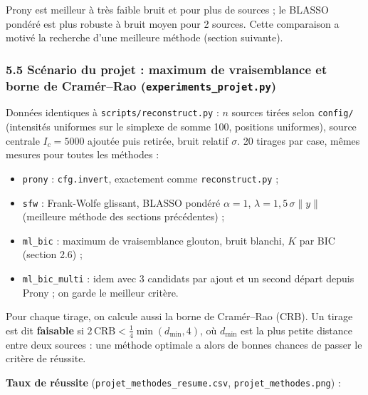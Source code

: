 \documentclass[
  french,
]{article}
\providecommand{\tightlist}{%
  \setlength{\itemsep}{0pt}\setlength{\parskip}{0pt}}
\begin{document}
Prony est meilleur à très faible bruit et pour plus de sources ; le
BLASSO pondéré est plus robuste à bruit moyen pour 2 sources. Cette
comparaison a motivé la recherche d'une meilleure méthode (section
suivante).

\subsubsection{\texorpdfstring{5.5 Scénario du projet : maximum de
vraisemblance et borne de Cramér--Rao
(\texttt{experiments\_projet.py})}{5.5 Scénario du projet : maximum de vraisemblance et borne de Cramér--Rao (experiments\_projet.py)}}\label{scuxe9nario-du-projet-maximum-de-vraisemblance-et-borne-de-cramuxe9rrao-experiments_projet.py}

Données identiques à \texttt{scripts/reconstruct.py} : \(n\) sources
tirées selon \texttt{config/} (intensités uniformes sur le simplexe de
somme 100, positions uniformes), source centrale \(I_c = 5000\) ajoutée
puis retirée, bruit relatif \(\sigma\). 20 tirages par case, mêmes
mesures pour toutes les méthodes :

\begin{itemize}
\tightlist
\item
  \texttt{prony} : \texttt{cfg.invert}, exactement comme
  \texttt{reconstruct.py} ;
\item
  \texttt{sfw} : Frank-Wolfe glissant, BLASSO pondéré \(\alpha = 1\),
  \(\lambda = 1{,}5\,\sigma\lVert y\rVert\) (meilleure méthode des
  sections précédentes) ;
\item
  \texttt{ml\_bic} : maximum de vraisemblance glouton, bruit blanchi,
  \(K\) par BIC (section 2.6) ;
\item
  \texttt{ml\_bic\_multi} : idem avec 3 candidats par ajout et un second
  départ depuis Prony ; on garde le meilleur critère.
\end{itemize}

Pour chaque tirage, on calcule aussi la borne de Cramér--Rao (CRB). Un
tirage est dit \textbf{faisable} si
\(2\,\mathrm{CRB} < \tfrac14\min(d_{\min}, 4)\), où \(d_{\min}\) est la
plus petite distance entre deux sources : une méthode optimale a alors
de bonnes chances de passer le critère de réussite.

\textbf{Taux de réussite} (\texttt{projet\_methodes\_resume.csv},
\texttt{projet\_methodes.png}) :
\end{document}

